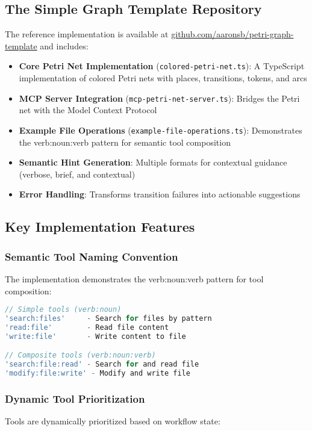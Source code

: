 \documentclass[11pt,a4paper]{article}
\begin{document}
\subsection{The Simple Graph Template Repository}

The reference implementation is available at \href{https://github.com/aaronsb/petri-graph-template}{github.com/aaronsb/petri-graph-template} and includes:

\begin{itemize}
\item \textbf{Core Petri Net Implementation} (\texttt{colored-petri-net.ts}): A TypeScript implementation of colored Petri nets with places, transitions, tokens, and arcs
\item \textbf{MCP Server Integration} (\texttt{mcp-petri-net-server.ts}): Bridges the Petri net with the Model Context Protocol
\item \textbf{Example File Operations} (\texttt{example-file-operations.ts}): Demonstrates the verb:noun:verb pattern for semantic tool composition
\item \textbf{Semantic Hint Generation}: Multiple formats for contextual guidance (verbose, brief, and contextual)
\item \textbf{Error Handling}: Transforms transition failures into actionable suggestions
\end{itemize}

\subsection{Key Implementation Features}

\subsubsection{Semantic Tool Naming Convention}
The implementation demonstrates the verb:noun:verb pattern for tool composition:

\begin{lstlisting}[language=TypeScript]
// Simple tools (verb:noun)
'search:files'     - Search for files by pattern
'read:file'        - Read file content
'write:file'       - Write content to file

// Composite tools (verb:noun:verb)  
'search:file:read' - Search for and read file
'modify:file:write' - Modify and write file
\end{lstlisting}

\subsubsection{Dynamic Tool Prioritization}
Tools are dynamically prioritized based on workflow state:
\end{document}
